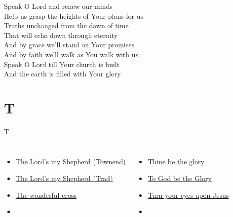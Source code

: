 \documentclass[aspectratio=169]{beamer}
\begin{document}
{\begin{frame}{}
\end{frame}
\hypertarget{Speak O Lord[](Getty/Townend)3}{}
\begin{frame}{}
\fontsize{16.666666666666668}{20.0}\selectfont

Speak O Lord and renew our minds\\ 
Help us grasp the heights of Your plans for us\\ 
Truths unchanged from the dawn of time\\ 
That will echo down through eternity\\ 
And by grace we'll stand on Your promises\\ 
And by faith we'll walk as You walk with us\\ 
Speak O Lord till Your church is built\\ 
And the earth is filled with Your glory

\end{frame}
}

\section{ T }

\begin{frame}[t]{T}
\begin{columns}[t]
\begin{itemize}
    \item \hyperlink{The Lord's my Shepherd['Psalm 23'](Townend)}{The Lord's my Shepherd (Townend)}
    \item \hyperlink{The Lord's my Shepherd['Psalm 23'](Trad)}{The Lord's my Shepherd (Trad)}
    \item \hyperlink{The wonderful cross['When I survey'](Tomlin)}{The wonderful cross}
    \item[] \phantom{1}
\end{itemize}
\begin{itemize}
    \item \hyperlink{Thine be the glory[]}{Thine be the glory}
    \item \hyperlink{To God be the Glory[]}{To God be the Glory}
    \item \hyperlink{Turn your eyes upon Jesus[]}{Turn your eyes upon Jesus}
    \item[] \phantom{1}
\end{itemize}
\end{columns}
\end{frame}
\end{document}
